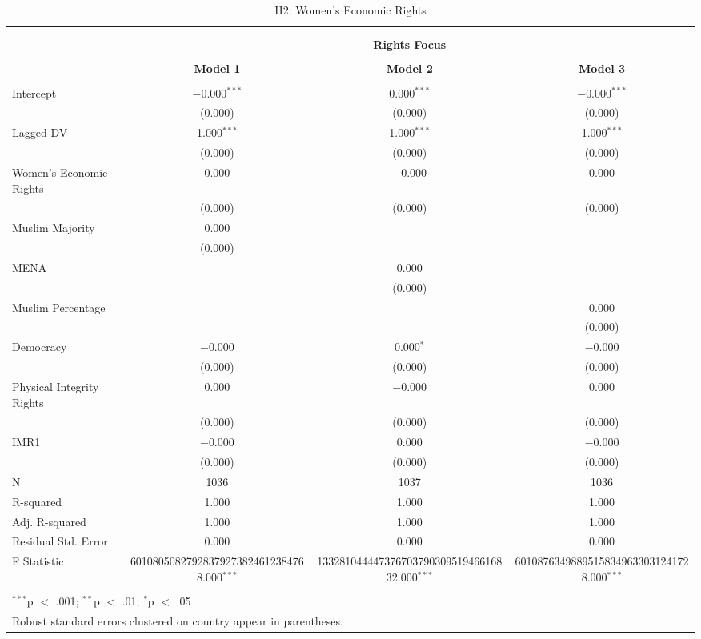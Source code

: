 
\begin{table}[!htbp] \centering 
  \caption{H2: Women's Economic Rights} 
  \label{} 
\begin{tabular}{@{\extracolsep{5pt}}lccc} 
\\[-1.8ex]\hline \\[-1.8ex] 
\\[-1.8ex] & \multicolumn{3}{c}{\textbf{Rights Focus}} \\ 
\\[-1.8ex] & \textbf{Model 1} & \textbf{Model 2} & \textbf{Model 3}\\ 
\hline \\[-1.8ex] 
 Intercept & $-$0.000$^{***}$ & 0.000$^{***}$ & $-$0.000$^{***}$ \\ 
  & (0.000) & (0.000) & (0.000) \\ 
  Lagged DV & 1.000$^{***}$ & 1.000$^{***}$ & 1.000$^{***}$ \\ 
  & (0.000) & (0.000) & (0.000) \\ 
  Women's Economic Rights & 0.000 & $-$0.000 & 0.000 \\ 
  & (0.000) & (0.000) & (0.000) \\ 
  Muslim Majority & 0.000 &  &  \\ 
  & (0.000) &  &  \\ 
  MENA &  & 0.000 &  \\ 
  &  & (0.000) &  \\ 
  Muslim Percentage &  &  & 0.000 \\ 
  &  &  & (0.000) \\ 
  Democracy & $-$0.000 & 0.000$^{*}$ & $-$0.000 \\ 
  & (0.000) & (0.000) & (0.000) \\ 
  Physical Integrity Rights & 0.000 & $-$0.000 & 0.000 \\ 
  & (0.000) & (0.000) & (0.000) \\ 
  IMR1 & $-$0.000 & 0.000 & $-$0.000 \\ 
  & (0.000) & (0.000) & (0.000) \\ 
 N & 1036 & 1037 & 1036 \\ 
R-squared & 1.000 & 1.000 & 1.000 \\ 
Adj. R-squared & 1.000 & 1.000 & 1.000 \\ 
Residual Std. Error & 0.000 & 0.000 & 0.000 \\ 
F Statistic & 60108050827928379273824612384768.000$^{***}$ & 13328104444737670379030951946616832.000$^{***}$ & 60108763498895158349633031241728.000$^{***}$ \\ 
\hline \\[-1.8ex] 
\multicolumn{4}{l}{$^{***}$p $<$ .001; $^{**}$p $<$ .01; $^{*}$p $<$ .05} \\ 
\multicolumn{4}{l}{Robust standard errors clustered on country appear in parentheses.} \\ 
\end{tabular} 
\end{table} 
